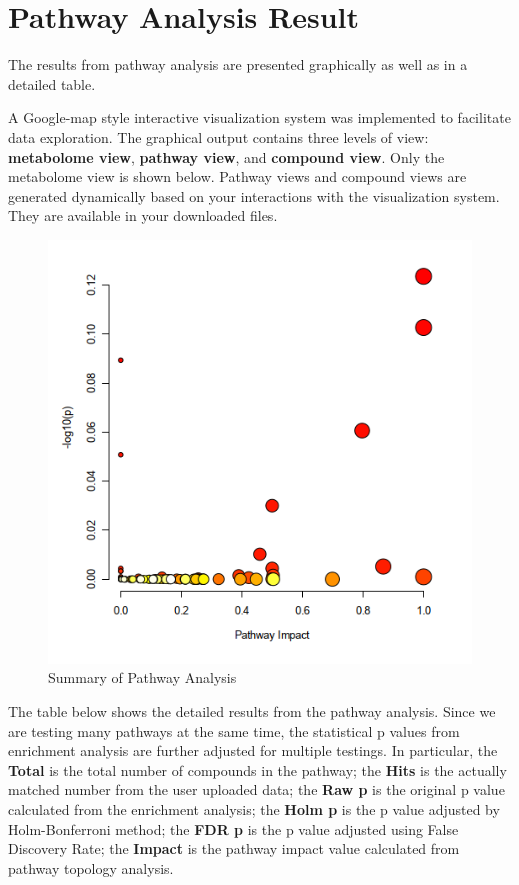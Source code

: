 \documentclass[a4paper]{article}
\begin{document}
\section{Pathway Analysis Result}

The results from pathway analysis are presented graphically as well as in a detailed table.



A Google-map style interactive visualization system was implemented to facilitate data exploration.
The graphical output contains three levels of view: \textbf{metabolome view}, \textbf{pathway view},
and \textbf{compound view}. Only the metabolome view is shown below.
Pathway views and compound views are generated dynamically based on your interactions with the
visualization system. They are available in your downloaded files. 

\begin{figure}[htp]
\begin{center}
\includegraphics[width=1.0\textwidth]{path_view_0_dpi72.png}
\caption{Summary of Pathway Analysis}
\end{center}
\label{path_view_0_dpi72.png}
\end{figure}
\clearpage


The table below shows the detailed results from the pathway analysis. Since
we are testing many pathways at the same time, the statistical p values from
enrichment analysis are further adjusted for multiple testings. In particular, 
the \textbf{Total} is the total number of compounds in the pathway;
the \textbf{Hits} is the actually matched number from the user uploaded data;
the \textbf{Raw p} is the original p value calculated from the enrichment analysis;
the \textbf{Holm p} is the p value adjusted by Holm-Bonferroni method;
the \textbf{FDR p} is the p value adjusted using False Discovery Rate;
the \textbf{Impact} is the pathway impact value calculated from pathway topology analysis.
\end{document}
